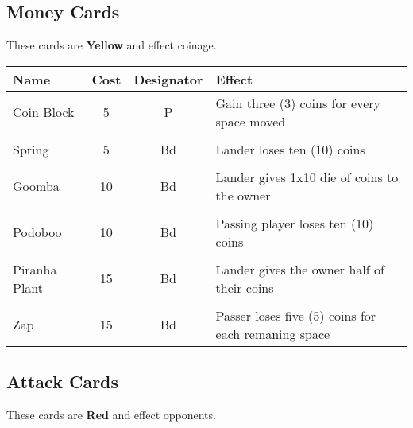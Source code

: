 \documentclass{article}
\begin{document}
\subsection{Money Cards}

These cards are \textbf{Yellow} and effect coinage.
\vspace*{2ex}

\begin{tabular}{lccl}
\textbf{Name} & \textbf{Cost} & \textbf{Designator} & \textbf{Effect} \\
\hline
Coin Block & 5 & P & Gain three (3) coins for every space moved \\
&&& \\
Spring & 5 & Bd & Lander loses ten (10) coins \\
&&& \\
Goomba & 10 & Bd & Lander gives 1x10 die of coins to the owner \\
&&& \\
Podoboo & 10 & Bd & Passing player loses ten (10) coins \\
&&& \\
Piranha Plant & 15 & Bd & Lander gives the owner half of their coins \\
&&& \\
Zap & 15 & Bd & Passer loses five (5) coins for each remaning space \\
\end{tabular}

\subsection{Attack Cards}

These cards are \textbf{Red} and effect opponents.
\vspace*{2ex}
\end{document}
